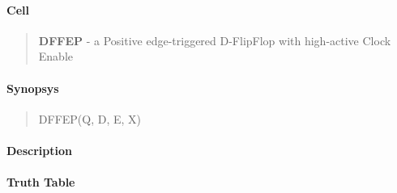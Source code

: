 \label{DFFEP}
\paragraph{Cell}
\begin{quote}
    \textbf{DFFEP} - a Positive edge-triggered D-FlipFlop with high-active Clock Enable
\end{quote}

\paragraph{Synopsys}
\begin{quote}
    DFFEP(Q, D, E, X)
\end{quote}

\paragraph{Description}

%

\paragraph{Truth Table}
%

